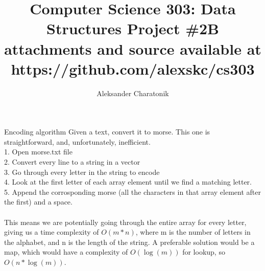 \documentclass[10pt]{article}
\title {Computer Science 303: Data Structures Project \#2B\\
\large attachments and source available at https://github.com/alexskc/cs303}
\author{Aleksander Charatonik}
\begin{document}
\maketitle

\begin{section}{Encoding algorithm}
  Given a text, convert it to morse. This one is straightforward, and, unfortunately, inefficient.\\
  1. Open morse.txt file\\
  2. Convert every line to a string in a vector\\
  3. Go through every letter in the string to encode\\
  4. Look at the first letter of each array element until we find a matching letter.\\
  5. Append the corrosponding morse (all the characters in that array element after the first) and a space.\\
\\
  This means we are potentially going through the entire array for every letter, giving us a time complexity of \(O(m*n)\), where m is the number of letters in the alphabet, and n is the length of the string. A preferable solution would be a map, which would have a complexity of \(O(\log(m))\) for lookup, so \(O(n*\log(m))\).
\end{section}
\end{document}
